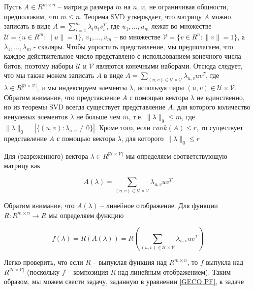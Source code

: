 \documentclass[oneside,final,14pt]{extreport} %
\begin{document}
Пусть $A \in R^{m \times n}$ -- матрица размера $m$ на $n$, и, не ограничивая общности, предположим, что $ m \le n $. Теорема SVD утверждает, что матрицу $A$ можно записать в виде $ A = \sum_{i = 1}^m \lambda_iu_iv_i^T$, где $u_1, \ldots, u_m$ лежат во множестве $\mathcal{U} = \{u \in R^m: \| u \| = 1 \}$, $v_1, \ldots, v_m$ -- во множестве $ \mathcal{V} = \{v \in R^n: \| v \| = 1 \}$, а $ \lambda_1, \ldots, \lambda_m$ - скаляры. Чтобы упростить представление, мы предполагаем, что каждое действительное число представлено с использованием конечного числа битов, поэтому наборы $\mathcal{U}$ и $\mathcal{V}$ являются конечными наборами. Отсюда следует, что мы также можем записать $A$ в виде $A = \sum_{(u, v) \in \mathcal{U} \times \mathcal{V}} \lambda_{u, v} uv^T$, где $\lambda \in R^{ | \mathcal{U} \times \mathcal{V} |}$, и мы индексируем элементы $ \lambda $, используя пары $ (u, v) \in \mathcal{U} \times \mathcal{V} $. Обратим внимание, что представление $ A $ с помощью вектора $ \lambda $ не единственно, но из теоремы SVD всегда существует представление $ A $, для которого количество ненулевых элементов $ \lambda $ не больше чем $ m $, т.е. $ \| \lambda \|_0 \le m $, где $ \| \lambda \|_0 = | \{(u, v): \lambda_ {u, v} \ne 0 \} | $. Кроме того, если $ rank (A) \le r $, то существует представление $ A $ с помощью вектора $ \lambda $, для которого $ \| \lambda \| _0 \le r $

Для (разреженного) вектора $ \lambda \in R^{| \mathcal{U} \times \mathcal{V} |} $ мы определяем соответствующую матрицу как

\begin{equation}
  A(\lambda) = \sum_{(u,v) \in \mathcal{U} \times \mathcal{V}} \lambda_{u,v} u v^T
\end{equation}

Обратим внимание, что $ A (\lambda) $ -- линейное отображение. Для функции $ R: R^{m \times n} \rightarrow R $ мы определяем функцию

\begin{equation}
  f(\lambda) = R(A(\lambda)) = R \left( \sum_{(u,v) \in \mathcal{U} \times \mathcal{V}} \lambda_{u,v} u v^T \right)
\end{equation}

Легко проверить, что если $ R $ -- выпуклая функция над $ R^{m \times n} $, то $ f $ выпукла над $ R ^ {| \mathcal{U} \times \mathcal{V} |} $ (поскольку $ f $ -- композиция $ R $ над линейным отображением). Таким образом, мы можем свести задачу, заданную в уравнении \ref{GECO PF}, к задаче
\end{document}
